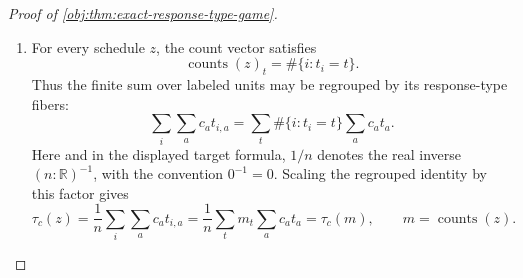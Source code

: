 \begin{proof}[Proof of \cref{obj:thm:exact-response-type-game}]
\begin{enumerate}
The two constructions are inverse to each other.  Under either construction,
\[
\mathcal D(A)=
\frac{\pi_{\operatorname{alloc}(A)}}{
|\mathcal O_{\mathrm{alloc}}(\operatorname{alloc}(A))|},
\qquad
\widehat\tau(A,y)=
\delta(\operatorname{alloc}(A),\operatorname{succ}(A,y)).
\]
It remains to identify the regrouped labeled risk with the orbit risk.  For a labeled schedule \(z\), put \(m_z=\operatorname{counts}(z)\) and define the observed labeled fiber
\[
\mathcal L_z(r,x)=
\{A\in\mathcal A_K^n:
\operatorname{alloc}(A)=r,
\operatorname{succ}(A,Y^{\mathrm{obs}}(z,A))=x\}.
\]
For a table \(h\in\mathcal H(m_z,r,x)\), the number of assignments in \(\mathcal L_z(r,x)\) having \(h_{t,a}\) units of response type \(t\) assigned to arm \(a\) is
\[
\prod_{t\in\mathcal T_K}
\frac{m_{z,t}!}{\prod_{a\in\mathcal A_K}h_{t,a}!}.
\]
Summing over the feasible contingency-table fiber and dividing by the allocation-orbit cardinality
\[
|\mathcal O_{\mathrm{alloc}}(r)|=
\frac{n!}{\prod_{a\in\mathcal A_K}r_a!}
\]
gives
\[
\frac{|\mathcal L_z(r,x)|}{|\mathcal O_{\mathrm{alloc}}(r)|}
=
\frac{\prod_{a\in\mathcal A_K}r_a!}{n!}
\sum_{h\in\mathcal H(m_z,r,x)}
\prod_{t\in\mathcal T_K}
\frac{m_{z,t}!}{\prod_{a\in\mathcal A_K}h_{t,a}!}
=
P_{m_z}(x\mid r),
\]
where the last equality is the likelihood formula in \cref{obj:def:orbit-likelihood}.  The target term is also constant on the response-count orbit,
\[
\tau_c(z)=
\frac1n\sum_i\sum_{a\in\mathcal A_K}c_a t_{i,a}
=
\frac1n\sum_{t\in\mathcal T_K}m_{z,t}\sum_{a\in\mathcal A_K}c_a t_a
=\tau_c(m_z).
\]
Therefore, regrouping first by allocation counts and then by observed fibers yields
\[
\begin{aligned}
R_n(p;z)
&=
\sum_r\sum_{A\in\mathcal O_{\mathrm{alloc}}(r)}
\frac{\pi_r}{|\mathcal O_{\mathrm{alloc}}(r)|}
\{\delta(r,\operatorname{succ}(A,Y^{\mathrm{obs}}(z,A)))-\tau_c(m_z)\}^2 \\
&=
\sum_r \pi_r\sum_x
\frac{|\mathcal L_z(r,x)|}{|\mathcal O_{\mathrm{alloc}}(r)|}
\{\delta(r,x)-\tau_c(m_z)\}^2 \\
&=
\sum_r \pi_r
\sum_x P_{m_z}(x\mid r)
\{\delta(r,x)-\tau_c(m_z)\}^2
=
R_n(q;m_z).
\end{aligned}
\]
This proves the stated bijection and the exact equality of allocation-count, observation-count, and risk rules. %

\item For every schedule \(z\), the count vector satisfies
\[
\operatorname{counts}(z)_t=\#\{i:t_i=t\}.
\]
Thus the finite sum over labeled units may be regrouped by its response-type fibers:
\[
\sum_i\sum_a c_a t_{i,a}
=
\sum_t
\#\{i:t_i=t\}\sum_a c_a t_a.
\]
Here and in the displayed target formula, \(1/n\) denotes the real inverse \((n:\mathbb R)^{-1}\), with the convention \(0^{-1}=0\).  Scaling the regrouped identity by this factor gives
\[
\tau_c(z)
=
\frac{1}{n}\sum_i\sum_a c_a t_{i,a}
=
\frac{1}{n}\sum_t m_t\sum_a c_a t_a
=
\tau_c(m),
\qquad m=\operatorname{counts}(z).
\] %


\end{enumerate}
\end{proof}
